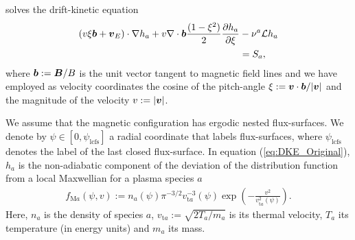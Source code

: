 {\MONKES} solves the drift-kinetic equation 
%
\begin{align}
(v \xi \vb*{b}  + \vb*{v}_E) \cdot \nabla h_a 
	+
	v\nabla \cdot \vb*{b} \frac{(1-\xi^2)}{2}  \pdv{h_a}{\xi}  
	& - \nu^{a} \mathcal{L} h_a
		\nonumber \\
	& = S_a,
	\label{eq:DKE_Original}
\end{align}
where $\vb*{b}:= \vb*{B}/B$ is the unit vector tangent to magnetic field lines and we have employed as velocity coordinates the cosine of the pitch-angle $\xi := \vb*{v}\cdot\vb*{b}/|\vb*{v}|$ and the magnitude of the velocity $v:=|\vb*{v}|$. 

We assume that the magnetic configuration has ergodic nested flux-surfaces. We denote by $\psi\in[0,\psi_{\text{lcfs}}]$ a radial coordinate that labels flux-surfaces, where $\psi_{\text{lcfs}}$ denotes the label of the last closed flux-surface. In equation (\ref{eq:DKE_Original}), $h_a$ is the non-adiabatic component of the deviation of the distribution function from a local Maxwellian for a plasma species $a$ 
%
\begin{align}
	f_{\text{M}a}(\psi, v) :=   n_a(\psi)  \pi^{-3/2}  {v_{\text{t}a}^{-3}(\psi)}  \exp(-\frac{v^2}{v_{\text{t}a}^2(\psi)}).
\end{align}
Here, $n_a$ is the density of species $a$, $v_{\text{t}a} := \sqrt{2T_a/m_a}$ is its thermal velocity, $T_a$ its temperature (in energy units) and $m_a$ its mass. 

%

